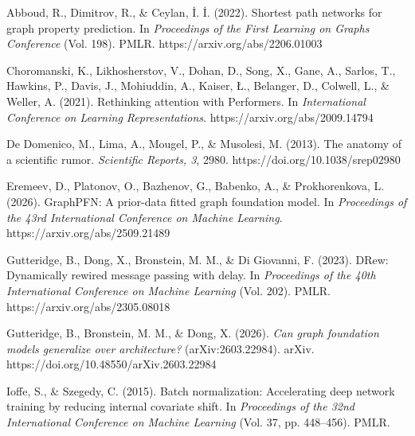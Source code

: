 
Abboud, R., Dimitrov, R., \& Ceylan, \.{I}. \.{I}. (2022). Shortest path networks for graph property prediction. In \emph{Proceedings of the First Learning on Graphs Conference} (Vol. 198). PMLR. https://arxiv.org/abs/2206.01003

Choromanski, K., Likhosherstov, V., Dohan, D., Song, X., Gane, A., Sarlos, T., Hawkins, P., Davis, J., Mohiuddin, A., Kaiser, \L{}., Belanger, D., Colwell, L., \& Weller, A. (2021). Rethinking attention with Performers. In \emph{International Conference on Learning Representations}. https://arxiv.org/abs/2009.14794

De Domenico, M., Lima, A., Mougel, P., \& Musolesi, M. (2013). The anatomy of a scientific rumor. \emph{Scientific Reports, 3}, 2980. https://doi.org/10.1038/srep02980

Eremeev, D., Platonov, O., Bazhenov, G., Babenko, A., \& Prokhorenkova, L. (2026). GraphPFN: A prior-data fitted graph foundation model. In \emph{Proceedings of the 43rd International Conference on Machine Learning}. https://arxiv.org/abs/2509.21489

Gutteridge, B., Dong, X., Bronstein, M. M., \& Di Giovanni, F. (2023). DRew: Dynamically rewired message passing with delay. In \emph{Proceedings of the 40th International Conference on Machine Learning} (Vol. 202). PMLR. https://arxiv.org/abs/2305.08018

Gutteridge, B., Bronstein, M. M., \& Dong, X. (2026). \emph{Can graph foundation models generalize over architecture?} (arXiv:2603.22984). arXiv. https://doi.org/10.48550/arXiv.2603.22984

Ioffe, S., \& Szegedy, C. (2015). Batch normalization: Accelerating deep network training by reducing internal covariate shift. In \emph{Proceedings of the 32nd International Conference on Machine Learning} (Vol. 37, pp. 448--456). PMLR.

